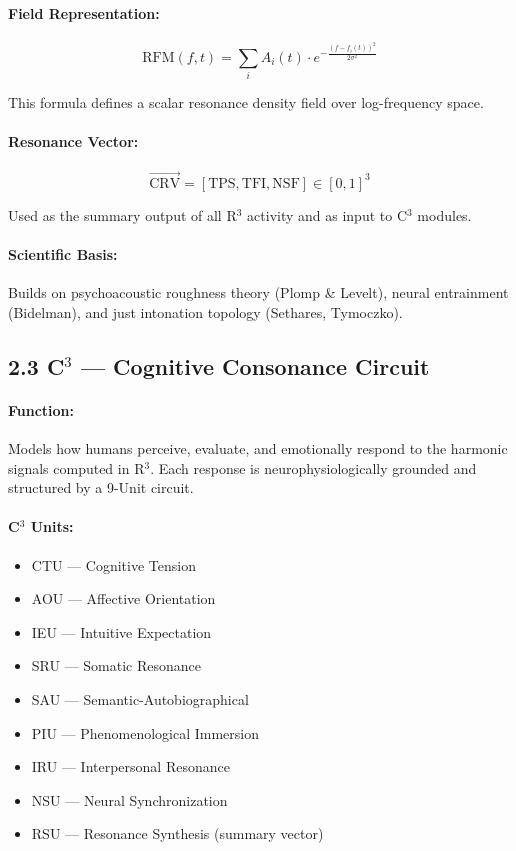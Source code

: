 \paragraph{Field Representation:}

\[
\text{RFM}(f, t) = \sum_i A_i(t) \cdot e^{-\frac{(f - f_i(t))^2}{2\sigma^2}}
\]

This formula defines a scalar resonance density field over log-frequency space.

\paragraph{Resonance Vector:}
\[
\vec{\text{CRV}} = [\text{TPS}, \text{TFI}, \text{NSF}] \in [0,1]^3
\]

Used as the summary output of all R$^{3}$ activity and as input to C$^{3}$ modules.

\paragraph{Scientific Basis:}  
Builds on psychoacoustic roughness theory (Plomp & Levelt), neural entrainment (Bidelman), and just intonation topology (Sethares, Tymoczko).

\subsection*{2.3 C$^{3}$ — Cognitive Consonance Circuit}

\paragraph{Function:}  
Models how humans perceive, evaluate, and emotionally respond to the harmonic signals computed in R$^{3}$. Each response is neurophysiologically grounded and structured by a 9-Unit circuit.

\paragraph{C$^{3}$ Units:}

\begin{itemize}
  \item CTU — Cognitive Tension
  \item AOU — Affective Orientation
  \item IEU — Intuitive Expectation
  \item SRU — Somatic Resonance
  \item SAU — Semantic-Autobiographical
  \item PIU — Phenomenological Immersion
  \item IRU — Interpersonal Resonance
  \item NSU — Neural Synchronization
  \item RSU — Resonance Synthesis (summary vector)
\end{itemize}

